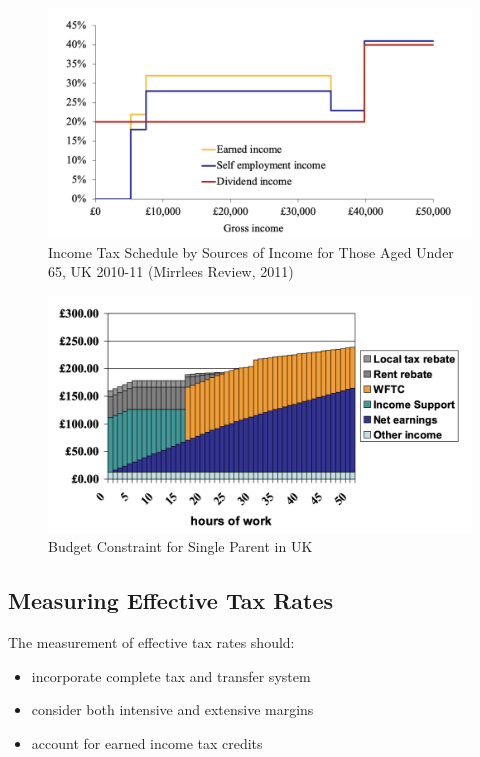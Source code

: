         \begin{figure}[H]
            \centering
            \includegraphics[width=4.5in]{images/ch13/13_taxscheme_2.png}
            \caption{Income Tax Schedule by Sources of Income for Those Aged Under 65, UK 2010-11 (Mirrlees Review, 2011)}
        \end{figure}

        \begin{figure}[H]
            \centering
            \includegraphics[width=4.5in]{images/ch13/13_taxscheme_3.png}
            \caption{Budget Constraint for Single Parent in UK}
        \end{figure}
    
    \subsection{Measuring Effective Tax Rates}

        The measurement of effective tax rates should:
        \begin{itemize}
            \item incorporate complete tax and transfer system
            \item consider both intensive and extensive margins
            \item account for earned income tax credits
        \end{itemize}

